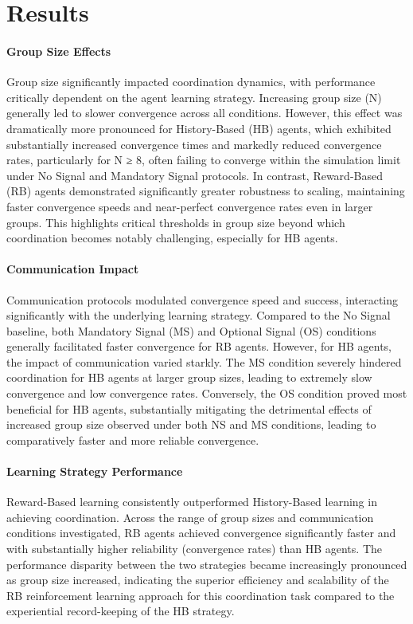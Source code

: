 \documentclass[12pt,a4paper]{article}
\begin{document}
\section{Results}

\paragraph{Group Size Effects} 
Group size significantly impacted coordination dynamics, with performance critically dependent on the agent learning strategy. Increasing group size (N) generally led to slower convergence across all conditions. However, this effect was dramatically more pronounced for History-Based (HB) agents, which exhibited substantially increased convergence times and markedly reduced convergence rates, particularly for N ≥ 8, often failing to converge within the simulation limit under No Signal and Mandatory Signal protocols. In contrast, Reward-Based (RB) agents demonstrated significantly greater robustness to scaling, maintaining faster convergence speeds and near-perfect convergence rates even in larger groups. This highlights critical thresholds in group size beyond which coordination becomes notably challenging, especially for HB agents.

\paragraph{Communication Impact} 
Communication protocols modulated convergence speed and success, interacting significantly with the underlying learning strategy. Compared to the No Signal baseline, both Mandatory Signal (MS) and Optional Signal (OS) conditions generally facilitated faster convergence for RB agents. However, for HB agents, the impact of communication varied starkly. The MS condition severely hindered coordination for HB agents at larger group sizes, leading to extremely slow convergence and low convergence rates. Conversely, the OS condition proved most beneficial for HB agents, substantially mitigating the detrimental effects of increased group size observed under both NS and MS conditions, leading to comparatively faster and more reliable convergence.

\paragraph{Learning Strategy Performance} 
Reward-Based learning consistently outperformed History-Based learning in achieving coordination. Across the range of group sizes and communication conditions investigated, RB agents achieved convergence significantly faster and with substantially higher reliability (convergence rates) than HB agents. The performance disparity between the two strategies became increasingly pronounced as group size increased, indicating the superior efficiency and scalability of the RB reinforcement learning approach for this coordination task compared to the experiential record-keeping of the HB strategy.
\end{document}
